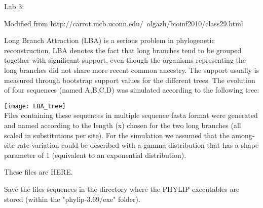 \documentclass[a4paper,10pt]{article}
\title{}
\author{}
\date{}
\begin{document}
\maketitle

Lab 3:

Modified from http://carrot.mcb.uconn.edu/~olgazh/bioinf2010/class29.html


Long Branch Attraction (LBA) is a serious problem in phylogenetic reconstruction. 
LBA denotes the fact that long branches tend to be grouped together with significant support, 
even though the organisms representing the long branches did not share more recent common ancestry. 
The support usually is measured through bootstrap support values for the different trees. 
The evolution of four sequences (named A,B,C,D) was simulated according to the following tree:

\texttt{[image: LBA\_tree]}\\

Files containing these sequences in multiple sequence fasta format were generated and named according to the length (x) 
chosen for the two long branches (all scaled in substitutions per site). 
For the simulation we assumed that the among-site-rate-variation could be described with a gamma distribution that has a shape parameter of 1 (equivalent to an exponential distribution).

These files are HERE. 

Save the files sequences in the directory where the PHYLIP executables are stored (within the "phylip-3.69/exe" folder).
\end{document}
